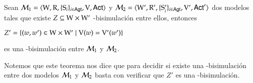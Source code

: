 
\begin{lema}
    Sean $\mathcal{M}_1=\langle \mathrm{W},\mathrm{R},\{ \mathrm{S}_i \}_{i \in {\rm \sf Agt}},\mathrm{V},{\rm \sf Act} \rangle$ y $\mathcal{M}_2=\langle \mathrm{W}',\mathrm{R}',\{ \mathrm{S}_i' \}_{i \in {\rm \sf Agt}},\mathrm{V}',{\rm \sf Act}' \rangle$ dos modelos tales que existe $Z \subseteq \mathrm{W} \times \mathrm{W}'$ \KHilogic-bisimulación entre ellos, entonces

    \begin{center}
        $Z' = \{(w,w') \in \mathrm{W} \times \mathrm{W}' \mid \mathrm{V}(w) = \mathrm{V}'(w')\}$
    \end{center}
    es una \KHilogic-bisimulación entre $\mathcal{M}_1$ y $\mathcal{M}_2$.
\end{lema}

Notemos que este teorema nos dice que para decidir si existe una \KHilogic-bisimulación entre dos modelos $\mathcal{M}_1$ y $\mathcal{M}_2$ basta con verificar que $Z'$ es una \KHilogic-bisimulación.

